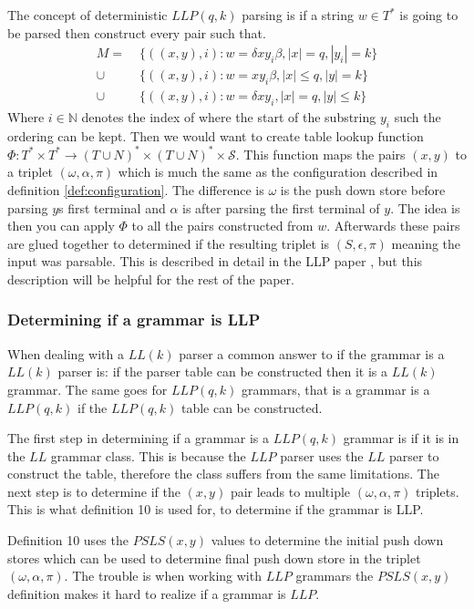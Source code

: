 The concept of deterministic $LLP(q,k)$ parsing is if a string $w \in T^*$ is going to be parsed then construct every pair such that.
\begin{align*}
    M =&\; \{((x, y), i) : w = \delta xy_i \beta, |x| = q, |y_i| = k\} \\
    \cup&\; \{((x, y), i) : w = xy_i \beta, |x| \leq q, |y| = k\} \\
    \cup&\; \{((x, y), i) : w = \delta xy_i, |x| = q, |y| \leq k\}
\end{align*}
Where $i \in \mathbb{N}$ denotes the index of where the start of the substring $y_i$ such the ordering can be kept. Then we would want to create table lookup function $\Phi: T^* \times T^* \to (T \cup N)^* \times (T \cup N)^* \times \mathcal{S}$. This function maps the pairs $(x,y)$ to a triplet $(\omega, \alpha, \pi)$ which is much the same as the configuration described in definition \ref{def:configuration}. The difference is $\omega$ is the push down store before parsing $y$s first terminal and $\alpha$ is after parsing the first terminal of $y$. The idea is then you can apply $\Phi$ to all the pairs constructed from $w$. Afterwards these pairs are glued together to determined if the resulting triplet is $(S, \epsilon, \pi)$ meaning the input was parsable. This is described in detail in the LLP paper \cite[7]{Vagner2007}, but this description will be helpful for the rest of the paper.

\subsubsection{Determining if a grammar is LLP}
When dealing with a $LL(k)$ parser a common answer to if the grammar is a $LL(k)$ parser is: if the parser table can be constructed then it is a $LL(k)$ grammar. The same goes for $LLP(q,k)$ grammars, that is a grammar is a $LLP(q,k)$ if the $LLP(q, k)$ table can be constructed.

The first step in determining if a grammar is a $LLP(q,k)$ grammar is if it is in the $LL$ grammar class. This is because the $LLP$ parser uses the $LL$ parser to construct the table, therefore the class suffers from the same limitations. The next step is to determine if the $(x, y)$ pair leads to multiple $(\omega, \alpha, \pi)$ triplets. This is what definition 10 \cite[13]{Vagner2007} is used for, to determine if the grammar is LLP.

Definition 10 \cite[13]{Vagner2007} uses the $PSLS(x, y)$ \cite[12]{Vagner2007} values to determine the initial push down stores which can be used to determine final push down store in the triplet $(\omega, \alpha, \pi)$. The trouble is when working with $LLP$ grammars the $PSLS(x, y)$ definition makes it hard to realize if a grammar is $LLP$.


